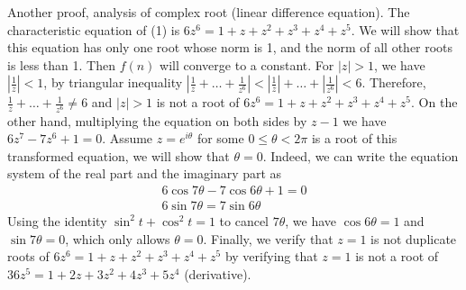 \documentclass{article}
\begin{document}
\begin{enumerate}
\begin{enumerate}
    Another proof, analysis of complex root (linear difference equation).
    The characteristic equation of (1) is
    $6z^6 = 1+z+z^2+z^3+z^4+z^5$. We will show that this equation
    has only one root whose norm is 1, and the norm of 
    all other roots is less than 1. Then $f(n)$ will converge
    to a constant. For $|z| > 1$,
    we have $|\frac{1}{z}|<1$, by triangular inequality
    $|\frac{1}{z}+\dots+\frac{1}{z^6}|<|\frac{1}{z}|+\dots
    +|\frac{1}{z^6}|<6$. Therefore,
    $\frac{1}{z}+\dots+\frac{1}{z^6}\neq 6$ and $|z|>1$
    is not a root of $6z^6 = 1+z+z^2+z^3+z^4+z^5$. 
    On the other hand, multiplying the equation on both sides
    by $z-1$ we have $6z^7 - 7z^6 + 1=0$. Assume $z=e^{i\theta}$
    for some $0\leq \theta < 2\pi$
    is a root of this transformed equation, we will show that
    $\theta = 0$. Indeed, we can write
    the equation system of the real part and the imaginary part
    as
    \begin{align*}
        6\cos7\theta - 7 \cos6\theta + 1 = 0 \\
        6 \sin 7 \theta = 7 \sin 6\theta
    \end{align*}
    Using the identity $\sin^2 t + \cos^2 t = 1$ to cancel 
    $7\theta$, we have $\cos6\theta=1$ and $\sin 7\theta = 0$,
    which only allows $\theta=0$. Finally, we verify that
    $z=1$ is not duplicate roots of $6z^6 = 1+z+z^2+z^3+z^4+z^5$
    by verifying that $z=1$ is not a root of $36z^5=1+2z+3z^2+4z^3+5z^4$ (derivative).
\end{enumerate}
        
\end{enumerate}
\end{document}
